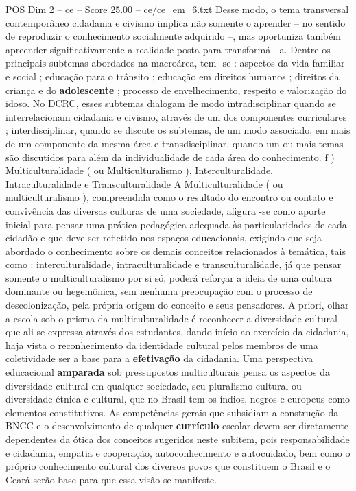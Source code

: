 \begin{textsample}{POS Dim 2 – ce – Score 25.00 – ce/ce\_em\_6.txt}
Desse modo, o tema transversal contemporâneo cidadania e civismo implica não somente o aprender – no sentido de reproduzir o conhecimento socialmente adquirido –, mas oportuniza também apreender significativamente a realidade posta para transformá -la.
Dentre os principais subtemas abordados na macroárea, tem -se : aspectos da vida familiar e social ; educação para o trânsito ; educação em direitos humanos ; direitos da criança e do \textbf{adolescente} ; processo de envelhecimento, respeito e valorização do idoso.
No DCRC, esses subtemas dialogam de modo intradisciplinar quando se interrelacionam cidadania e civismo, através de um dos componentes curriculares ; interdisciplinar, quando se discute os subtemas, de um modo associado, em mais de um componente da mesma área e transdisciplinar, quando um ou mais temas são discutidos para além da individualidade de cada área do conhecimento. f ) Multiculturalidade ( ou Multiculturalismo ), Interculturalidade, Intraculturalidade e Transculturalidade A Multiculturalidade ( ou multiculturalismo ), compreendida como o resultado do encontro ou contato e convivência das diversas culturas de uma sociedade, afigura -se como aporte inicial para pensar uma prática pedagógica adequada às particularidades de cada cidadão e que deve ser refletido nos espaços educacionais, exigindo que seja abordado o conhecimento sobre os demais conceitos relacionados à temática, tais como : interculturalidade, intraculturalidade e transculturalidade, já que pensar somente o multiculturalismo por si só, poderá reforçar a ideia de uma cultura dominante ou hegemônica, sem nenhuma preocupação com o processo de descolonização, pela própria origem do conceito e seus pensadores.
A priori, olhar a escola sob o prisma da multiculturalidade é reconhecer a diversidade cultural que ali se expressa através dos estudantes, dando início ao exercício da cidadania, haja vista o reconhecimento da identidade cultural pelos membros de uma coletividade ser a base para a \textbf{efetivação} da cidadania.
Uma perspectiva educacional \textbf{amparada} sob pressupostos multiculturais pensa os aspectos da diversidade cultural em qualquer sociedade, seu pluralismo cultural ou diversidade étnica e cultural, que no Brasil tem os índios, negros e europeus como elementos constitutivos.
As competências gerais que subsidiam a construção da BNCC e o desenvolvimento de qualquer \textbf{currículo} escolar devem ser diretamente dependentes da ótica dos conceitos sugeridos neste subitem, pois responsabilidade e cidadania, empatia e cooperação, autoconhecimento e autocuidado, bem como o próprio conhecimento cultural dos diversos povos que constituem o Brasil e o Ceará serão base para que essa visão se manifeste.

\end{textsample}
